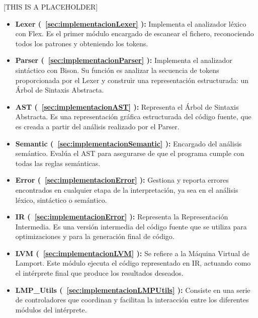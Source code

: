 \vspace{0.5cm}

[THIS IS A PLACEHOLDER]

\vspace{0.5cm}

\begin{itemize}
    \item \textbf{Lexer (~\ref{sec:implementacionLexer} ):} Implementa el analizador léxico con Flex. Es el primer módulo encargado de escanear el fichero, reconociendo todos los patrones y obteniendo los tokens.
    
    \item \textbf{Parser (~\ref{sec:implementacionParser} ):} Implementa el analizador sintáctico con Bison. Su función es analizar la secuencia de tokens proporcionada por el Lexer y construir una representación estructurada: un Árbol de Sintaxis Abstracta.
    
    \item \textbf{AST (~\ref{sec:implementacionAST} ):} Representa el Árbol de Sintaxis Abstracta. Es una representación gráfica estructurada del código fuente, que es creada a partir del análisis realizado por el Parser.
    
    \item \textbf{Semantic (~\ref{sec:implementacionSemantic} ):} Encargado del análisis semántico. Evalúa el AST para asegurarse de que el programa cumple con todas las reglas semánticas.
    
    \item \textbf{Error (~\ref{sec:implementacionError} ):} Gestiona y reporta errores encontrados en cualquier etapa de la interpretación, ya sea en el análisis léxico, sintáctico o semántico.
    
    \item \textbf{IR (~\ref{sec:implementacionError} ):} Representa la Representación Intermedia. Es una versión intermedia del código fuente que se utiliza para optimizaciones y para la generación final de código.
    
    \item \textbf{LVM (~\ref{sec:implementacionLVM} ):} Se refiere a la Máquina Virtual de Lamport. Este módulo ejecuta el código representado en IR, actuando como el intérprete final que produce los resultados deseados.
    
    \item \textbf{LMP\_Utils (~\ref{sec:implementacionLMPUtils} ):} Consiste en una serie de controladores que coordinan y facilitan la interacción entre los diferentes módulos del intérprete.
    
\end{itemize}

